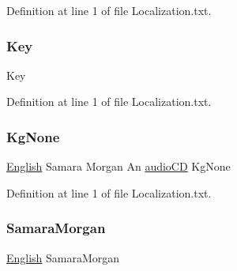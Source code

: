 Definition at line 1 of file Localization.\+txt.

\mbox{\label{_the_01_restless_01_curse_2_config_2_localization_8txt_ab3c7af4820830f9166ede9e5623c4e73}} 
\subsubsection{\texorpdfstring{Key}{Key}}
{\footnotesize\ttfamily Key}



Definition at line 1 of file Localization.\+txt.

\mbox{\label{_the_01_restless_01_curse_2_config_2_localization_8txt_acc1c43e0980c5828bcfaf85313744919}} 
\subsubsection{\texorpdfstring{KgNone}{KgNone}}
{\footnotesize\ttfamily \mbox{\hyperlink{_sphere_i_i_01_winter_01_project_2_config_2_localization_8txt_ad896b63205779b1b09e86d941ce13976}{English}} Samara Morgan An \mbox{\hyperlink{_sphere_i_i_01_music_01_boxes_2_config_2_localization_8txt_ae0a4281bb52a78c638f75d315de5da12}{audio\+CD}} Kg\+None}



Definition at line 1 of file Localization.\+txt.

\mbox{\label{_the_01_restless_01_curse_2_config_2_localization_8txt_aaab0dede1e0f13cd5d9b134f9bdf86c5}} 
\subsubsection{\texorpdfstring{SamaraMorgan}{SamaraMorgan}}
{\footnotesize\ttfamily \mbox{\hyperlink{_sphere_i_i_01_winter_01_project_2_config_2_localization_8txt_ad896b63205779b1b09e86d941ce13976}{English}} Samara\+Morgan}



